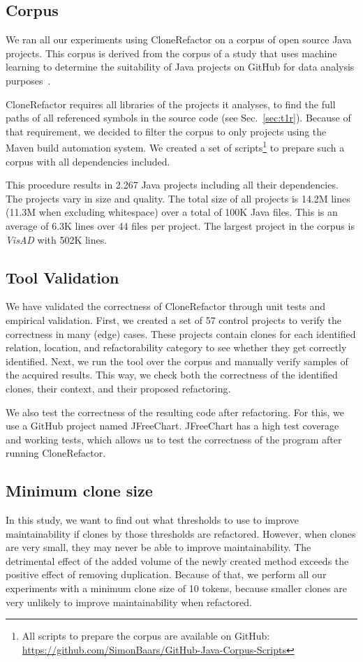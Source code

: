 \documentclass[conference]{IEEEtran}
\begin{document}
\subsection{Corpus}
We ran all our experiments using CloneRefactor on a corpus of open source Java projects. This corpus is derived from the corpus of a study that uses machine learning to determine the suitability of Java projects on GitHub for data analysis purposes~\cite{githubCorpus2013}.

CloneRefactor requires all libraries of the projects it analyses, to find the full paths of all referenced symbols in the source code (see Sec.~\ref{sec:t1r}). Because of that requirement, we decided to filter the corpus to only projects using the Maven build automation system. We created a set of scripts\footnote{All scripts to prepare the corpus are available on GitHub: \url{https://github.com/SimonBaars/GitHub-Java-Corpus-Scripts}} to prepare such a corpus with all dependencies included.

This procedure results in 2.267 Java projects including all their dependencies. The projects vary in size and quality. The total size of all projects is 14.2M lines (11.3M when excluding whitespace) over a total of 100K Java files. This is an average of 6.3K lines over 44 files per project. The largest project in the corpus is \textit{VisAD} with 502K lines.

\subsection{Tool Validation}
We have validated the correctness of CloneRefactor through unit tests and empirical validation. First, we created a set of 57 control projects to verify the correctness in many (edge) cases. These projects contain clones for each identified relation, location, and refactorability category to see whether they get correctly identified. Next, we run the tool over the corpus and manually verify samples of the acquired results. This way, we check both the correctness of the identified clones, their context, and their proposed refactoring.

We also test the correctness of the resulting code after refactoring. For this, we use a GitHub project named JFreeChart. JFreeChart has a high test coverage and working tests, which allows us to test the correctness of the program after running CloneRefactor.

\subsection{Minimum clone size}
In this study, we want to find out what thresholds to use to improve maintainability if clones by those thresholds are refactored. However, when clones are very small, they may never be able to improve maintainability. The detrimental effect of the added volume of the newly created method exceeds the positive effect of removing duplication. Because of that, we perform all our experiments with a minimum clone size of 10 tokens, because smaller clones are very unlikely to improve maintainability when refactored.
\end{document}
